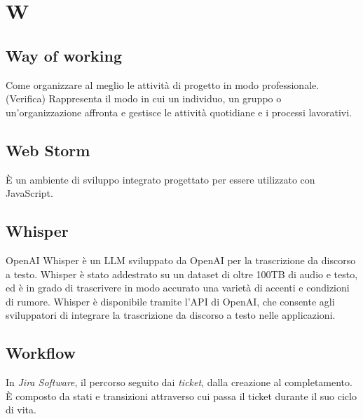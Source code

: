 \chapter{W}

\section{Way of working}\label{sec:WoW}
Come organizzare al meglio le attività di progetto in modo professionale.
(Verifica) Rappresenta il modo in cui un individuo, un gruppo o un'organizzazione affronta e gestisce le attività quotidiane e i processi lavorativi. 

\section{Web Storm}\label{sec:wstrm}
È un ambiente di sviluppo integrato progettato per essere utilizzato con JavaScript. 

\section{Whisper}
OpenAI Whisper è un LLM sviluppato da OpenAI per la trascrizione da discorso a testo. Whisper è stato addestrato su un dataset di oltre 100TB di audio e testo, ed è in grado di trascrivere in modo accurato una varietà di accenti e condizioni di rumore. Whisper è disponibile tramite l'API di OpenAI, che consente agli sviluppatori di integrare la trascrizione da discorso a testo nelle applicazioni.

\section{Workflow}
In \emph{Jira Software}, il percorso seguito dai \emph{ticket}, dalla creazione al completamento. È composto da stati e transizioni attraverso cui passa il ticket durante il suo ciclo di vita.


